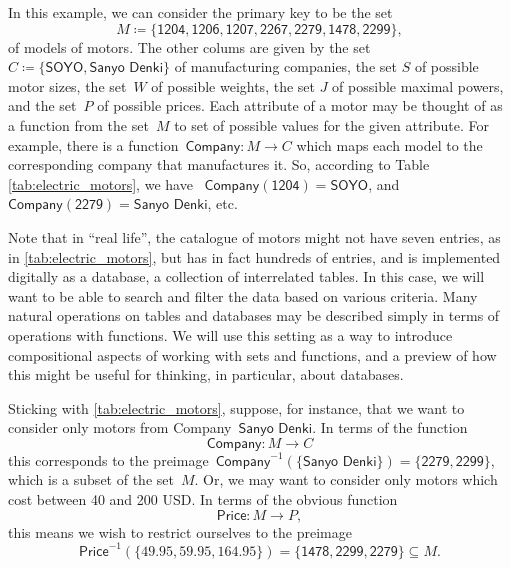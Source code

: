 In this example, we can consider the primary key to be the set
\begin{equation*}
M \coloneqq \{ \textsf{1204}, \textsf{1206}, \textsf{1207}, \textsf{2267}, \textsf{2279}, \textsf{1478}, \textsf{2299} \},
\end{equation*}
of models of motors. The other colums are given by the set~$C \coloneqq \{ \textsf{SOYO}, \textsf{Sanyo Denki}\}$ of manufacturing companies, the set $S$ of possible motor sizes, the set~$W$ of possible weights, the set $J$ of possible maximal powers, and the set~$P$ of possible prices. Each attribute of a motor may be thought of as a function from the set~$M$ to set of possible values for the given attribute. For example, there is a function~$\textsf{Company}\colon M \to C$ which maps each model to the corresponding company that manufactures it. So, according to Table \ref{tab:electric_motors}, we have ~$\textsf{Company}(\textsf{1204}) = \textsf{SOYO}$, and~$\textsf{Company}(\textsf{2279}) = \textsf{Sanyo Denki}$, etc.

Note that in ``real life'', the catalogue of motors might not have seven entries, as in \cref{tab:electric_motors}, but has in fact hundreds of entries, and is implemented digitally as a database,  a collection of interrelated tables. In this case, we will want to be able to search and filter the data based on various criteria. Many natural operations on tables and databases may be described simply in terms of operations with functions. We will use this setting as a way to introduce compositional aspects of working with sets and functions, and a preview of how this might be useful for thinking, in particular, about databases.

Sticking with \cref{tab:electric_motors}, suppose, for instance, that we want to consider only motors from Company~$\textsf{Sanyo Denki}$. In terms of the function
\begin{equation*}
\textsf{Company}\colon M \to C
\end{equation*}
this corresponds to the preimage~$\textsf{Company}^{-1}(\{ \textsf{Sanyo Denki} \}) = \{ \textsf{2279}, \textsf{2299}\}$, which is a subset of the set~$M$. Or, we may want to consider only motors which cost between 40 and 200 USD. In terms of the obvious function
\begin{equation*}
\textsf{Price}\colon M \to P,
\end{equation*}
this means we wish to restrict ourselves to the preimage
\begin{equation*}
\textsf{Price}^{-1}(\{ 49.95, 59.95, 164.95\}) = \{ \textsf{1478}, \textsf{2299}, \textsf{2279} \} \subseteq M.
\end{equation*}

